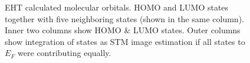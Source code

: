 \begin{figure}[]
{			\label{fig:}
		}
		\caption{EHT calculated molecular orbitals. HOMO and LUMO states together with five neighboring states (shown in the same column). Inner two columns show HOMO \& LUMO states. Outer columns show integration of states as STM image estimation if all states to $E_F$ were contributing equally.}
		\label{fig:}
	\end{figure}
	\vfill
\restoregeometry